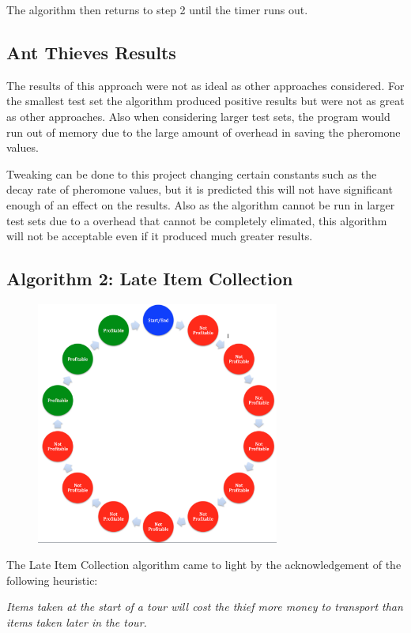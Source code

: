 \documentclass[a4paper,12pt]{article}
\begin{document}
The algorithm then returns to step 2 until the timer runs out.

\subsection*{Ant Thieves Results}


The results of this approach were not as ideal as other approaches considered. For the smallest test set the algorithm produced positive results but were not as great as other approaches. Also when considering larger test sets, the program would run out of memory due to the large amount of overhead in saving the pheromone values.

Tweaking can be done to this project changing certain constants such as the decay rate of pheromone values, but it is predicted this will not have significant enough of an effect on the results. Also as the algorithm cannot be run in larger test sets due to a overhead that cannot be completely elimated, this algorithm will not be acceptable even if it produced much greater results.





\subsection*{Algorithm 2: Late Item Collection}
\begin{figure}[h]
\centering
\includegraphics[width=80mm]{AlgorithmIdea.png}
\end{figure}
The Late Item Collection algorithm came to light by the acknowledgement of the following heuristic:

\begin{center}
\emph{Items taken at the start of a tour will cost the thief more money to transport than items taken later in the tour.}
\end{center}
\end{document}
